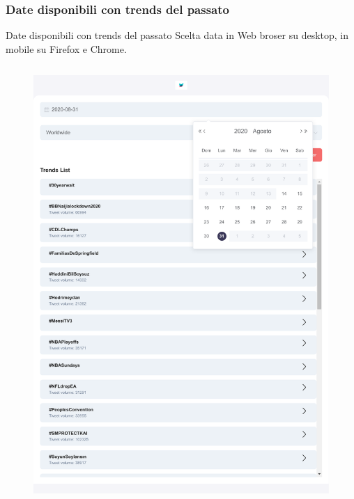\documentclass[xcolor=svgnames, aspectratio=169]{beamer}
\begin{document}

\subsubsection{Date disponibili con trends del passato}

\begin{frame}{Date disponibili con trends del passato}
    Scelta data in Web broser su desktop, in mobile su Firefox e Chrome.
    \begin{columns}[t]
        \vspace*{-12pt}
        \begin{figure}[H]
            \centering\includegraphics[width=0.32\paperwidth,height=0.65\paperheight,keepaspectratio]{FrontEnd_TrendrApp_Scelta_Data.pdf}
        \end{figure}

\end{columns}
\end{frame}
\end{document}
